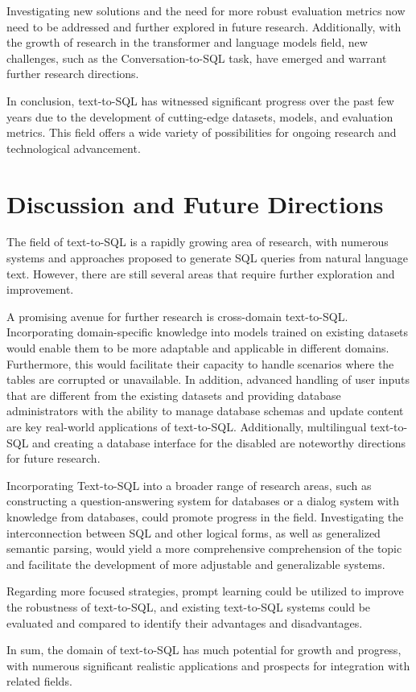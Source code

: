 Investigating new solutions and the need for more robust evaluation metrics now need to be addressed and further explored in future research. Additionally, with the growth of research in the transformer and language models field, new challenges, such as the Conversation-to-SQL task, have emerged and warrant further research directions.

In conclusion, text-to-SQL has witnessed significant progress over the past few years due to the development of cutting-edge datasets, models, and evaluation metrics. This field offers a wide variety of possibilities for ongoing research and technological advancement.

\clearpage

\section{Discussion and Future Directions}

The field of text-to-SQL is a rapidly growing area of research, with numerous systems and approaches proposed to generate SQL queries from natural language text. However, there are still several areas that require further exploration and improvement.

A promising avenue for further research is cross-domain text-to-SQL. Incorporating domain-specific knowledge into models trained on existing datasets would enable them to be more adaptable and applicable in different domains. Furthermore, this would facilitate their capacity to handle scenarios where the tables are corrupted or unavailable. In addition, advanced handling of user inputs that are different from the existing datasets and providing database administrators with the ability to manage database schemas and update content are key real-world applications of text-to-SQL. Additionally, multilingual text-to-SQL and creating a database interface for the disabled are noteworthy directions for future research.

Incorporating Text-to-SQL into a broader range of research areas, such as constructing a question-answering system for databases or a dialog system with knowledge from databases, could promote progress in the field. Investigating the interconnection between SQL and other logical forms, as well as generalized semantic parsing, would yield a more comprehensive comprehension of the topic and facilitate the development of more adjustable and generalizable systems.

Regarding more focused strategies, prompt learning could be utilized to improve the robustness of text-to-SQL, and existing text-to-SQL systems could be evaluated and compared to identify their advantages and disadvantages.

In sum, the domain of text-to-SQL has much potential for growth and progress, with numerous significant realistic applications and prospects for integration with related fields.